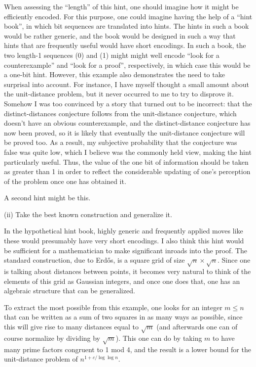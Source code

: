 \documentclass[11pt,reqno]{amsart}
\numberwithin{equation}{section}
\theoremstyle{definition}
\theoremstyle{remark}
\begin{document}
\noindent When assessing the ``length'' of this hint, one should imagine how it might be efficiently encoded. For this purpose, one could imagine having the help of a ``hint book'', in which bit sequences are translated into hints. The hints in such a book would be rather generic, and the book would be designed in such a way that hints that are frequently useful would have short encodings. In such a book, the two length-1 sequences (0) and (1) might might well encode ``look for a counterexample'' and ``look for a proof'', respectively, in which case this would be a one-bit hint. However, this example also demonstrates the need to take surprisal into account. For instance, I have myself thought a small amount about the unit-distance problem, but it never occurred to me to try to disprove it. Somehow I was too convinced by a story that turned out to be incorrect: that the distinct-distances conjecture follows from the unit-distance conjecture, which doesn't have an obvious counterexample, and the distinct-distance conjecture has now been proved, so it is likely that eventually the unit-distance conjecture will be proved too. As a result, my subjective probability that the conjecture was false was quite low, which I believe was the commonly held view, making the hint particularly useful. Thus, the value of the one bit of information should be taken as greater than 1 in order to reflect the considerable updating of one's perception of the problem once one has obtained it.

A second hint might be this.
\bigskip

\centerline{(ii) Take the best known construction and generalize it.}
\bigskip

\noindent In the hypothetical hint book, highly generic and frequently applied moves like these would presumably have very short encodings. I also think this hint would be sufficient for a mathematician to make significant inroads into the proof. The standard construction, due to Erd\H os, is a square grid of size $\sqrt n\times\sqrt n$. Since one is talking about distances between points, it becomes very natural to think of the elements of this grid as Gaussian integers, and once one does that, one has an algebraic structure that can be generalized. 

To extract the most possible from this example, one looks for an integer $m\leq n$ that can be written as a sum of two squares in as many ways as possible, since this will give rise to many distances equal to $\sqrt m$ (and afterwards one can of course normalize by dividing by $\sqrt m$). This one can do by taking $m$ to have many prime factors congruent to 1 mod 4, and the result is a lower bound for the unit-distance problem of $n^{1+c/\log\log n}$. 
\end{document}
